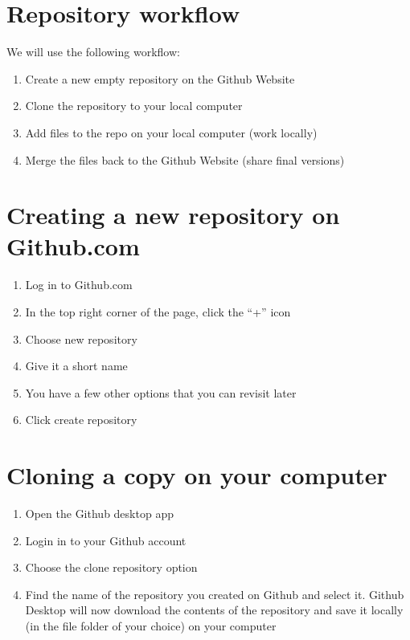 \documentclass[]{book}
\providecommand{\tightlist}{%
  \setlength{\itemsep}{0pt}\setlength{\parskip}{0pt}}
\theoremstyle{definition}
\theoremstyle{definition}
\theoremstyle{definition}
\theoremstyle{remark}
\begin{document}
\section{Repository workflow}\label{repository-workflow}

We will use the following workflow:

\begin{enumerate}
\def\labelenumi{\arabic{enumi}.}
\tightlist
\item
  Create a new empty repository on the Github Website
\item
  Clone the repository to your local computer
\item
  Add files to the repo on your local computer (work locally)
\item
  Merge the files back to the Github Website (share final versions)
\end{enumerate}

\section{Creating a new repository on
Github.com}\label{creating-a-new-repository-on-github.com}

\begin{enumerate}
\def\labelenumi{\arabic{enumi}.}
\tightlist
\item
  Log in to Github.com
\item
  In the top right corner of the page, click the ``+'' icon
\item
  Choose new repository
\item
  Give it a short name
\item
  You have a few other options that you can revisit later
\item
  Click create repository
\end{enumerate}

\section{Cloning a copy on your
computer}\label{cloning-a-copy-on-your-computer}

\begin{enumerate}
\def\labelenumi{\arabic{enumi}.}
\tightlist
\item
  Open the Github desktop app
\item
  Login in to your Github account
\item
  Choose the clone repository option
\item
  Find the name of the repository you created on Github and select it.
  Github Desktop will now download the contents of the repository and
  save it locally (in the file folder of your choice) on your computer
\end{enumerate}
\end{document}
